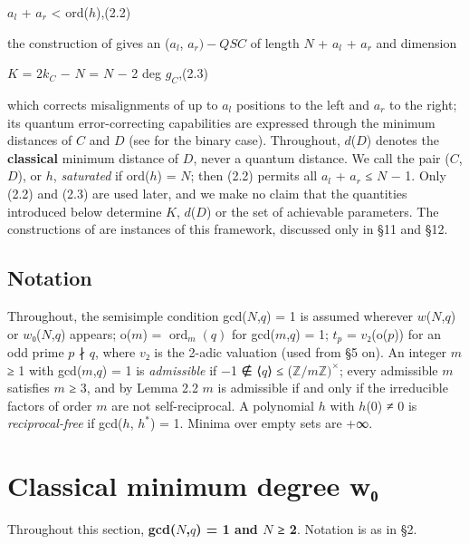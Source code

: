\documentclass[pdflatex,sn-mathphys-num]{sn-jnl}
\theoremstyle{thmstyleone}
\theoremstyle{thmstylethree}
\begin{document}
\begin{center}\(a_l\) + \(a_r\) \textless{} ord(\(h\)),\qquad (2.2)\end{center}

the construction of \cite{FTW,XYY16,LM18} gives an (\(a_l\), \(a_r)-QSC\) of length \(N\) + \(a_l\) + \(a_r\) and dimension

\begin{center}\(K\) = \(2k_C\) − \(N\) = \(N\) − 2 deg \(g_C\),\qquad (2.3)\end{center}

which corrects misalignments of up to \(a_l\) positions to the left and \(a_r\) to the right; its quantum error-correcting capabilities are expressed through the minimum distances of \(C\) and \(D\) (see \cite{FTW} for the binary case). Throughout, \(d\)(\(D\)) denotes the \textbf{classical} minimum distance of \(D\), never a quantum distance. We call the pair (\(C\), \(D\)), or \(h\), \emph{saturated} if ord(\(h\)) = \(N\); then (2.2) permits all \(a_l\) + \(a_r\) ≤ \(N\) − 1. Only (2.2) and (2.3) are used later, and we make no claim that the quantities introduced below determine \(K\), \(d\)(\(D\)) or the set of achievable parameters. The constructions of \cite{LZ22,DMLHW20} are instances of this framework, discussed only in §11 and §12.

\subsection{Notation}

Throughout, the semisimple condition gcd(\(N\),\(q\)) = 1 is assumed wherever \(w\)(\(N\),\(q\)) or \(w\)₀(\(N\),\(q\)) appears; o(\(m\)) = \(\operatorname{ord}_m(q)\) for gcd(\(m\),\(q\)) = 1; \(t_p\) = \(v\)₂(o(\(p\))) for an odd prime \(p\) ∤ \(q\), where \(v\)₂ is the 2-adic valuation (used from §5 on). An integer \(m\) ≥ 1 with gcd(\(m\),\(q\)) = 1 is \emph{admissible} if −1 ∉ ⟨\(q\)⟩ ≤ (\(ℤ/mℤ)^×\); every admissible \(m\) satisfies \(m\) ≥ 3, and by Lemma 2.2 \(m\) is admissible if and only if the irreducible factors of order \(m\) are not self-reciprocal. A polynomial \(h\) with \(h\)(0) ≠ 0 is \emph{reciprocal-free} if gcd(\(h\), \(h^{*}\)) = 1. Minima over empty sets are +∞.

\section{Classical minimum degree w₀}

Throughout this section, \textbf{gcd(\(N\),\(q\)) = 1 and \(N\) ≥ 2}. Notation is as in §2.
\end{document}
